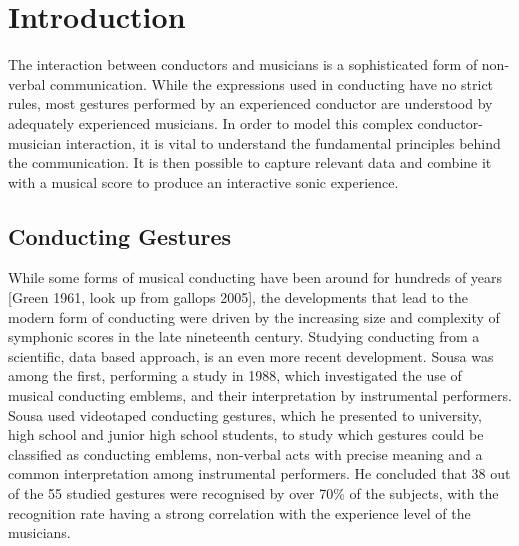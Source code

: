 \chapter{Introduction}
\label{chapter:intro}

The interaction between conductors and musicians
is a sophisticated form of non-verbal communication.
While the expressions used in conducting have no strict rules,
most gestures performed by an experienced conductor are understood by
adequately experienced musicians.
In order to model this complex conductor-musician interaction,
it is vital to understand the fundamental principles behind the communication.
It is then possible to capture relevant data
and combine it with a musical score to
produce an interactive sonic experience.

\section{Conducting Gestures}


While some forms of musical conducting have been around for hundreds of years
[Green 1961, look up from gallops 2005],
the developments that lead to the modern form of conducting
were driven by the increasing size and complexity of symphonic scores
in the late nineteenth century. \cite{gallops2005}
Studying conducting from a scientific, data based approach,
is an even more recent development.
Sousa \cite{sousa1988} was among the first,
performing a study in 1988,
which investigated the use of musical conducting emblems,
and their interpretation by instrumental performers.
Sousa used videotaped conducting gestures,
which he presented to university, high school and junior high school students,
to study which gestures could be classified as conducting emblems,
non-verbal acts with precise meaning and
a common interpretation among instrumental performers.
He concluded that 38 out of the 55 studied gestures
were recognised by over 70\% of the subjects,
with the recognition rate having a strong correlation
with the experience level of the musicians.

